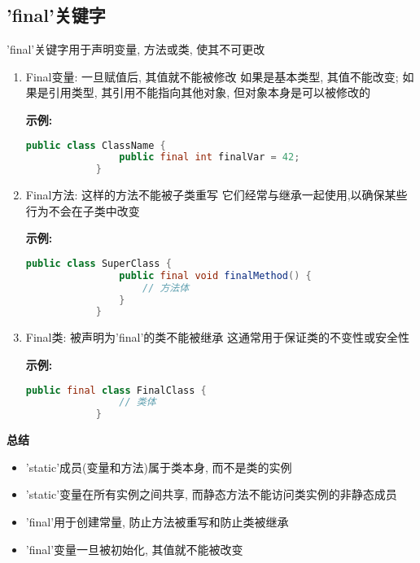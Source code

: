 \documentclass{article}
\begin{document}
\subsection{ 'final'关键字}
'final'关键字用于声明变量, 方法或类, 使其不可更改
\begin{enumerate}
    \item Final变量:
    \subitem 一旦赋值后, 其值就不能被修改
    \subitem 如果是基本类型, 其值不能改变; 如果是引用类型, 其引用不能指向其他对象, 但对象本身是可以被修改的

    \textbf{示例:}
    \begin{tcolorbox}
        \begin{lstlisting}[language=java]
            public class ClassName {
                public final int finalVar = 42;
            }
        \end{lstlisting}
    \end{tcolorbox}
    \item Final方法:
    \subitem 这样的方法不能被子类重写
    \subitem 它们经常与继承一起使用,以确保某些行为不会在子类中改变

    \textbf{示例:}
    \begin{tcolorbox}
        \begin{lstlisting}[language=java]
            public class SuperClass {
                public final void finalMethod() {
                    // 方法体
                }
            }
        \end{lstlisting}
    \end{tcolorbox}
    \item Final类:
    \subitem 被声明为'final'的类不能被继承
    \subitem 这通常用于保证类的不变性或安全性

    \textbf{示例:}
    \begin{tcolorbox}
        \begin{lstlisting}[language=java]
            public final class FinalClass {
                // 类体
            }
        \end{lstlisting}
    \end{tcolorbox}
\end{enumerate}
\textbf{总结}

\begin{itemize}
    \item 'static'成员(变量和方法)属于类本身, 而不是类的实例
    \item 'static'变量在所有实例之间共享, 而静态方法不能访问类实例的非静态成员
    \item 'final'用于创建常量, 防止方法被重写和防止类被继承
    \item 'final'变量一旦被初始化, 其值就不能被改变
\end{itemize}
\end{document}
